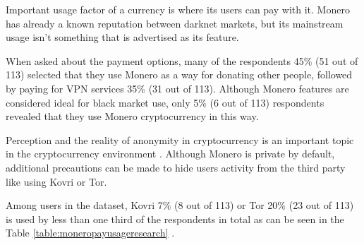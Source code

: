 \documentclass[
  printed, %
  table,   %
  lof,     %
  lot,     %
           oneside, color
]{fithesis3}
\begin{document}
Important usage factor of a currency is where its users can pay with it. Monero has already a known reputation between darknet markets, but its mainstream usage isn't something that is advertised as its feature. 

When asked about the payment options, many of the respondents 45\% (51 out of 113) selected that they use Monero as a way for donating other people, followed by paying for VPN services 35\% (31 out of 113). Although Monero features are considered ideal for black market use, only 5\% (6 out of 113) respondents revealed that they use Monero cryptocurrency in this way.%

Perception and the reality of anonymity in cryptocurrency is an important topic in the cryptocurrency environment \cite{amarasinghe2019survey}. Although Monero is private by default, additional precautions can be made to hide users activity from the third party like using Kovri or Tor. 

Among users in the dataset, Kovri 7\% (8 out of 113) or Tor 20\% (23 out of 113) is used by less than one third of the respondents in total as can be seen in the Table \ref{table:moneropayusageresearch} .
\end{document}
